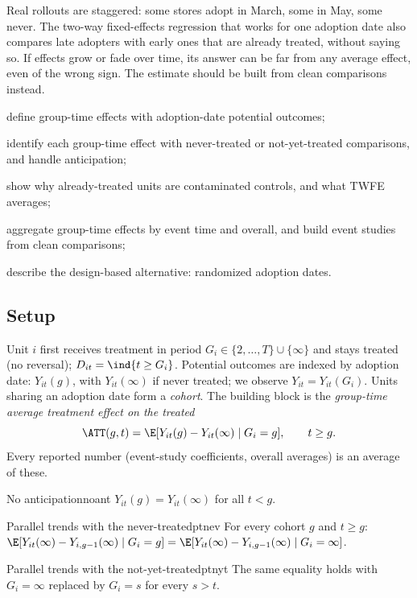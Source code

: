 \documentclass[11pt]{article}
\begin{document}

\begin{decision}
Real rollouts are staggered: some stores adopt in March, some in May, some never. The two-way fixed-effects regression that
works for one adoption date also compares late adopters with early ones that are already treated, without saying so. If effects grow or fade
over time, its answer can be far from any average effect, even of the wrong sign. The estimate should be built from clean
comparisons instead.
\end{decision}

\begin{goals}
  \item define group-time effects with adoption-date potential outcomes;
  \item identify each group-time effect with never-treated or not-yet-treated comparisons, and handle anticipation;
  \item show why already-treated units are contaminated controls, and what TWFE averages;
  \item aggregate group-time effects by event time and overall, and build event studies from clean comparisons;
  \item describe the design-based alternative: randomized adoption dates.
\end{goals}

\sectionone

\subsection{Setup}

Unit $i$ first receives treatment in period $G_i \in \{2, \dots, T\} \cup \{\infty\}$ and stays treated (no reversal); $D_{it} = \ind{t \ge G_i}$. Potential
outcomes are indexed by adoption date: $Y_{it}(g)$, with $Y_{it}(\infty)$ if never treated; we observe $Y_{it} = Y_{it}(G_i)$. Units sharing an adoption
date form a \emph{cohort}. The building block is the \emph{group-time average treatment effect on the treated}
\[
  \ATT(g, t) = \E[Y_{it}(g) - Y_{it}(\infty) \mid G_i = g], \qquad t \ge g .
\]
Every reported number (event-study coefficients, overall averages) is an average of these.

\begin{assum}{No anticipation}{noant}
$Y_{it}(g) = Y_{it}(\infty)$ for all $t < g$.
\end{assum}
\begin{assum}{Parallel trends with the never-treated}{ptnev}
For every cohort $g$ and $t \ge g$: $\E[Y_{it}(\infty) - Y_{i,g-1}(\infty) \mid G_i = g] = \E[Y_{it}(\infty) - Y_{i,g-1}(\infty) \mid G_i = \infty]$.
\end{assum}
\begin{assum}{Parallel trends with the not-yet-treated}{ptnyt}
The same equality holds with $G_i = \infty$ replaced by $G_i = s$ for every $s > t$.
\end{assum}
\end{document}
